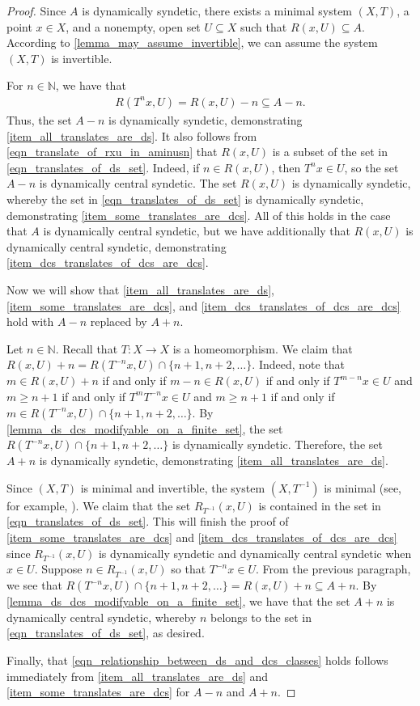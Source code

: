 \documentclass[letter,11pt]{article}
\theoremstyle{plain}
\theoremstyle{definition}
\theoremstyle{plain}
\theoremstyle{plain}
\numberwithin{equation}{section}
\newcommand{\N}{\mathbb{N}}
\renewcommand{\geq}{\geqslant}
\begin{document}
\begin{proof}
    Since $A$ is dynamically syndetic, there exists a minimal system $(X,T)$, a point $x \in X$, and a nonempty, open set $U \subseteq X$ such that $R(x,U) \subseteq A$. According to \cref{lemma_may_assume_invertible}, we can assume the system $(X, T)$ is invertible.
    
    For $n \in \N$, we have that
    \begin{align}
        \label{eqn_translate_of_rxu_in_aminusn}
        R(T^n x, U) = R(x,U) - n \subseteq A - n.
    \end{align}
    Thus, the set $A-n$ is dynamically syndetic, demonstrating \eqref{item_all_translates_are_ds}.  It also follows from \eqref{eqn_translate_of_rxu_in_aminusn} that $R(x,U)$ is a subset of the set in \eqref{eqn_translates_of_ds_set}.  Indeed, if $n \in R(x,U)$, then $T^n x \in U$, so the set $A-n$ is dynamically central syndetic.  The set $R(x,U)$ is dynamically syndetic, whereby the set in \eqref{eqn_translates_of_ds_set} is dynamically syndetic, demonstrating \eqref{item_some_translates_are_dcs}.  All of this holds in the case that $A$ is dynamically central syndetic, but we have additionally that $R(x,U)$ is dynamically central syndetic, demonstrating \eqref{item_dcs_translates_of_dcs_are_dcs}.

    Now we will show that \eqref{item_all_translates_are_ds}, \eqref{item_some_translates_are_dcs}, and \eqref{item_dcs_translates_of_dcs_are_dcs} hold with $A-n$ replaced by $A+n$.
    
    Let $n \in \N$.  Recall that $T: X \to X$ is a homeomorphism. We claim that $R(x,U) + n = R(T^{-n}x, U) \cap \{n+1,n+2,\ldots\}$.  Indeed, note that $m \in R(x,U) + n$ if and only if $m - n \in R(x,U)$ if and only if $T^{m-n} x \in U$ and $m \geq n+1$ if and only if $T^m T^{-n}x \in U$ and $m \geq n+1$ if and only if $m \in R(T^{-n}x,U) \cap \{n+1, n+2, \ldots\}$.  By \cref{lemma_ds_dcs_modifyable_on_a_finite_set}, the set $R(T^{-n}x,U) \cap \{n+1,n+2,\ldots\}$ is dynamically syndetic.  Therefore, the set $A + n$ is dynamically syndetic, demonstrating \eqref{item_all_translates_are_ds}.
    
    Since $(X,T)$ is minimal and invertible, the system $(X,T^{-1})$ is minimal (see, for example, \cite[Lemma 2.7]{glasscock_koutsogiannis_richter_2019}). We claim that the set $R_{T^{-1}}(x,U)$ is contained in the set in \eqref{eqn_translates_of_ds_set}.  This will finish the proof of \eqref{item_some_translates_are_dcs} and \eqref{item_dcs_translates_of_dcs_are_dcs} since $R_{T^{-1}}(x,U)$ is dynamically syndetic and dynamically central syndetic when $x \in U$.  Suppose $n \in R_{T^{-1}}(x,U)$ so that $T^{-n} x \in U$.  From the previous paragraph, we see that $R(T^{-n}x, U) \cap \{n+1, n+2, \ldots\} = R(x,U) + n \subseteq A +n$.  By \cref{lemma_ds_dcs_modifyable_on_a_finite_set}, we have that the set $A + n$ is dynamically central syndetic, whereby $n$ belongs to the set in \eqref{eqn_translates_of_ds_set}, as desired.

    Finally, that \eqref{eqn_relationship_between_ds_and_dcs_classes} holds follows immediately from \eqref{item_all_translates_are_ds} and \eqref{item_some_translates_are_dcs} for $A-n$ and $A+n$.
\end{proof}
\end{document}
